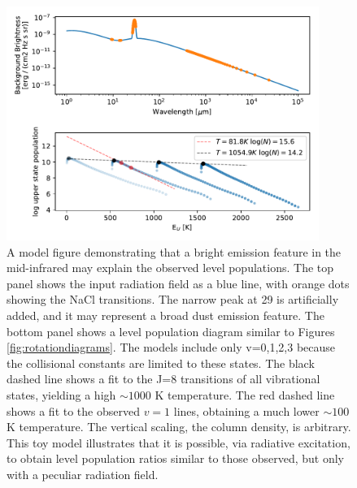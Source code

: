 \documentclass[twocolumn]{aastex62}
\begin{document}
\begin{figure}[!htp]
\includegraphics[scale=1,width=4in]{figures/simulated_populations_with_wacky_radiation_field.pdf}
\caption{A model figure demonstrating that a bright emission feature in the mid-infrared may
explain the observed level populations.  The top panel shows the input radiation field as a blue
line, with orange dots showing the NaCl transitions.  The narrow peak at 29 \um is artificially
added, and it may represent a broad dust emission feature.
The bottom panel shows a level population diagram similar to Figures \ref{fig:rotationdiagrams}.
The models include only v=0,1,2,3 because the collisional constants are limited to these states.
The black dashed line shows a fit to the J=8 transitions of all vibrational states, yielding a high
$\sim1000$ K temperature.  The red dashed line shows a fit to the observed $v=1$ lines, obtaining a
much lower $\sim100$ K temperature.  The vertical scaling, the column density, is arbitrary.
This toy model illustrates that it is possible, via radiative excitation, to obtain level
population ratios similar to those observed, but only with a peculiar radiation field.
}
\label{fig:naclexcitationmodel}
\end{figure}
\end{document}
